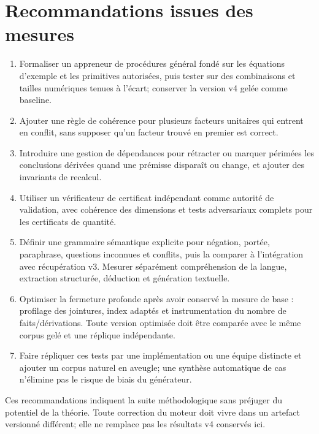 \documentclass[11pt,a4paper]{article}
\begin{document}
\section{Recommandations issues des mesures}
\begin{enumerate}[leftmargin=*]
\item Formaliser un appreneur de procédures général fondé sur les équations d’exemple et les primitives autorisées, puis tester sur des combinaisons et tailles numériques tenues à l’écart; conserver la version v4 gelée comme baseline.
\item Ajouter une règle de cohérence pour plusieurs facteurs unitaires qui entrent en conflit, sans supposer qu’un facteur trouvé en premier est correct.
\item Introduire une gestion de dépendances pour rétracter ou marquer périmées les conclusions dérivées quand une prémisse disparaît ou change, et ajouter des invariants de recalcul.
\item Utiliser un vérificateur de certificat indépendant comme autorité de validation, avec cohérence des dimensions et tests adversariaux complets pour les certificats de quantité.
\item Définir une grammaire sémantique explicite pour négation, portée, paraphrase, questions inconnues et conflits, puis la comparer à l’intégration avec récupération v3. Mesurer séparément compréhension de la langue, extraction structurée, déduction et génération textuelle.
\item Optimiser la fermeture profonde après avoir conservé la mesure de base : profilage des jointures, index adaptés et instrumentation du nombre de faits/dérivations. Toute version optimisée doit être comparée avec le même corpus gelé et une réplique indépendante.
\item Faire répliquer ces tests par une implémentation ou une équipe distincte et ajouter un corpus naturel en aveugle; une synthèse automatique de cas n’élimine pas le risque de biais du générateur.
\end{enumerate}

Ces recommandations indiquent la suite méthodologique sans préjuger du potentiel de la théorie. Toute correction du moteur doit vivre dans un artefact versionné différent; elle ne remplace pas les résultats v4 conservés ici.
\end{document}

